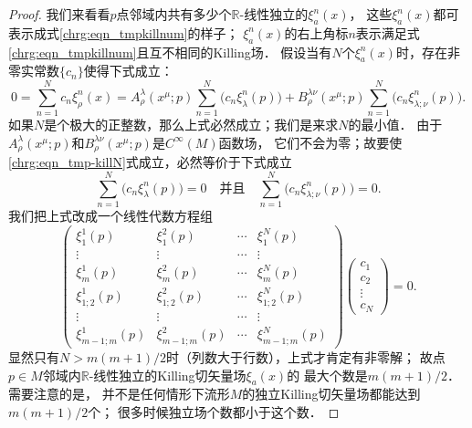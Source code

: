 \begin{proof}
    我们来看看$p$点邻域内共有多少个$\mathbb{R}$-线性独立的$\xi_a^n(x)$，
    这些$\xi_a^n(x)$都可表示成式\eqref{chrg:eqn_tmpkillnum}的样子；
    $\xi_a^n(x)$的右上角标$n$表示满足式\eqref{chrg:eqn_tmpkillnum}且互不相同的Killing场．
    假设当有$N$个$\xi_a^n(x)$时，存在非零实常数$\{c_n\}$使得下式成立：
    \begin{equation}\label{chrg:eqn_tmp-killN}
        0=\sum_{n=1}^{N} c_n \xi_\rho^n(x) =  %
        A_\rho^\lambda(x^\mu;p) \sum_{n=1}^{N} \bigl(c_n\xi_\lambda^n(p)\bigr)+
        B_\rho^{\lambda\nu}(x^\mu;p) \sum_{n=1}^{N}
         \bigl(c_n\xi_{\lambda;\nu}^n(p)\bigr)  .
    \end{equation} %
    如果$N$是个极大的正整数，那么上式必然成立；我们是来求$N$的最小值．
    由于$A_\rho^\lambda(x^\mu;p)$和$B_\rho^{\lambda\nu}(x^\mu;p)$是$C^\infty(M)$函数场，
    它们不会为零；故要使\eqref{chrg:eqn_tmp-killN}式成立，必然等价于下式成立
    \begin{equation}\label{chrg:eqn_tmp-killN2}
        \sum_{n=1}^{N} \bigl(c_n\xi_\lambda^n(p)\bigr) =0
        \quad \text{并且}\quad
        \sum_{n=1}^{N} \bigl(c_n\xi_{\lambda;\nu}^n(p)\bigr) =0 .
    \end{equation}
    我们把上式改成一个线性代数方程组
    \begin{equation}\label{chrg:eqn_kvm}
        \begin{pmatrix}
            \xi_1^1(p)& \xi_1^2(p)& \cdots & \xi_1^N(p) \\
            \vdots & \vdots & \cdots & \vdots \\
            \xi_m^1(p)& \xi_m^2(p)& \cdots & \xi_m^N(p) \\
            \xi_{1;2}^1(p)& \xi_{1;2}^2(p)& \cdots & \xi_{1;2}^N(p) \\
            \vdots & \vdots & \cdots & \vdots \\
            \xi_{m-1;m}^1(p)& \xi_{m-1;m}^2(p)& \cdots & \xi_{m-1;m}^N(p)
        \end{pmatrix}
        \begin{pmatrix}
            c_1 \\ c_2 \\ \vdots \\ c_N
        \end{pmatrix} =0 .
    \end{equation}
    显然只有$N>m(m+1)/2$时（列数大于行数），上式才肯定有非零解；
    故点$p\in M$邻域内$\mathbb{R}$-线性独立的Killing切矢量场$\xi_a(x)$的
    最大个数是$m(m+1)/2$．需要注意的是，
    并不是任何情形下流形$M$的独立Killing切矢量场都能达到$m(m+1)/2$个；
    很多时候独立场个数都小于这个数．   
\end{proof}

